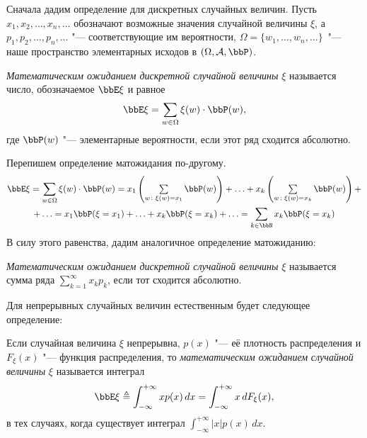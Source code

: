 Сначала дадим определение для дискретных случайных величин. Пусть $x_1,x_2,\dots,x_n,\dots$ обозначают возможные значения случайной величины $\xi$, а $p_1,p_2,\dots,p_n,\dots$ "--- соответствующие им вероятности, $\Omega = \{w_1,\dots, w_n,...\}$~"--- наше пространство элементарных исходов в $(\Omega,\mathcal A, \bbP)$.
\begin{defn}\label{teorver1}
\textit{Математическим ожиданием дискретной случайной величины} $\xi$ называется число, обозначаемое $\bbE\xi$ и равное
\begin{equation}
\bbE\xi = \sum_{w \in \Omega} \xi(w)\cdot \bbP(w),
\end{equation}
где $\bbP(w)$ "--- элементарные вероятности, если этот ряд сходится абсолютно.
\end{defn}
Перепишем определение матожидания по-другому.
\begin{multline*}
\bbE\xi=\sum_{w \in \Omega} \xi(w)\cdot \bbP(w)=x_1\left(\textstyle\sum\limits_{w\colon \xi(w)=x_1} \bbP(w)\right)+\ldots+x_k\left(\textstyle\sum\limits_{w\colon \xi(w)=x_k} \bbP(w)\right)+\\+\ldots =x_1\bbP(\xi=x_1)+\ldots+ x_k\bbP(\xi=x_k)+\ldots=\sum_{k\in \bbN} x_k\bbP(\xi=x_k)
\end{multline*}
В силу этого равенства, дадим аналогичное определение матожиданию:
\begin{defnn}\label{teorver1s}
\textit{Математическим ожиданием дискретной случайной величины} $\xi$ называется сумма ряда $\sum\limits_{k=1}^{\infty}x_k p_k$, если тот сходится абсолютно.
\end{defnn}


Для непрерывных случайных величин естественным будет следующее определение: 
\begin{defn} 
Если случайная величина $\xi$ непрерывна, $p(x)$ "--- её плотность распределения и $F_\xi(x)$ "--- функция распределения,  то \textit{математическим ожиданием} \textit{случайной величины} $\xi$ называется интеграл
\begin{equation}
\bbE\xi\triangleq\int_{-\infty}^{+\infty} xp(x)\,dx = \int_{-\infty}^{+\infty} x\,dF_\xi(x),
\end{equation}
в тех случаях, когда существует интеграл $\int_{-\infty}^{+\infty} |x|p(x)\,dx.$ 
\end{defn}




